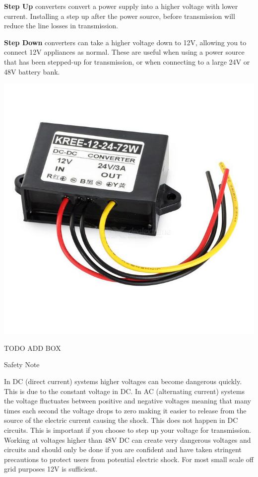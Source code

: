 \documentclass{article}
\theoremstyle{definition}
\theoremstyle{definition}
\theoremstyle{remark}
\begin{document}
    \textbf{Step Up} converters convert a power supply into a higher voltage with lower current. Installing a step up after the power source, before transmission will reduce the line losses in transmission.

    \textbf{Step Down} converters can take a higher voltage down to 12V, allowing you to connect 12V appliances as normal. These are useful when using a power source that has been stepped-up for transmission, or when connecting to a large 24V or 48V battery bank.

    \begin{center}
      \includegraphics[width=0.15\paperwidth]{../Images/image_8_2_(dc_dc_converter).png}
    \end{center}

    TODO ADD BOX

    Safety Note
    
    In DC (direct current) systems higher voltages can become dangerous quickly. This is due to the constant voltage in DC. In AC (alternating current) systems the voltage fluctuates between positive and negative voltages meaning that many times each second the voltage drops to zero making it easier to release from the source of the electric current causing the shock. This does not happen in DC circuits. This is important if you choose to step up your voltage for transmission. Working at voltages higher than 48V DC can create very dangerous voltages and circuits and should only be done if you are confident and have taken stringent precautions to protect users from potential electric shock. For most small scale off grid purposes 12V is sufficient. 
  
\end{document}
